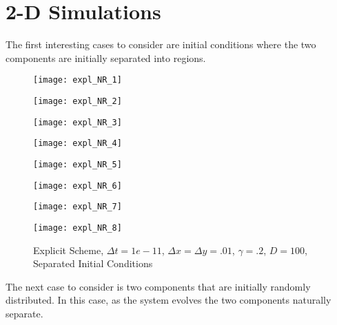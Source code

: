 \documentclass[]{article}
\theoremstyle{definition}
\numberwithin{equation}{section}
\numberwithin{equation}{section}
\begin{document}
\section{2-D Simulations}
The first interesting cases to consider are initial conditions where the two components are initially separated into regions.
\begin{center}
\begin{figure}[H]
	\begin{minipage}{0.5\textwidth}
		\hspace*{-2cm}
		\texttt{[image: expl\_NR\_1]}
	\end{minipage}
	\begin{minipage}{0.5\textwidth}
		\texttt{[image: expl\_NR\_2]}
	\end{minipage}
	\begin{minipage}{0.5\textwidth}
		\hspace*{-2cm}
	\texttt{[image: expl\_NR\_3]}
\end{minipage}
	\begin{minipage}{0.5\textwidth}
	\texttt{[image: expl\_NR\_4]}
\end{minipage}	
\begin{minipage}{0.5\textwidth}
	\hspace*{-2cm}
\texttt{[image: expl\_NR\_5]}
\end{minipage}
\begin{minipage}{0.5\textwidth}
	\texttt{[image: expl\_NR\_6]}
\end{minipage}
\end{figure}
\begin{figure}[H]
	\begin{minipage}{0.5\textwidth}
		\hspace*{-2cm}
	\texttt{[image: expl\_NR\_7]}
\end{minipage}
	\begin{minipage}{0.5\textwidth}
	\texttt{[image: expl\_NR\_8]}
\end{minipage}
\caption{Explicit Scheme, $\Delta t = 1e-11$, $\Delta x = \Delta y = .01$, $\gamma = .2$, $D = 100$, Separated Initial Conditions}
\end{figure}
\end{center}
The next case to consider is two components that are initially randomly distributed. In this case, as the system evolves the two components naturally separate.
\end{document}
